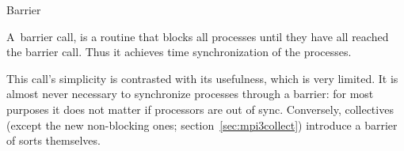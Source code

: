  {Barrier}
\label{sec:barrier}

A~barrier call,
%
%
is a
routine that blocks all processes until they have all reached the barrier
call. Thus it achieves time synchronization of the processes.

This call's simplicity is contrasted with its usefulness, which
is very limited. It is almost never necessary to synchronize processes
through a barrier: for most purposes it does not matter if processors
are out of sync. Conversely, collectives (except the new non-blocking
ones; section~\ref{sec:mpi3collect}) introduce a barrier of sorts themselves.

